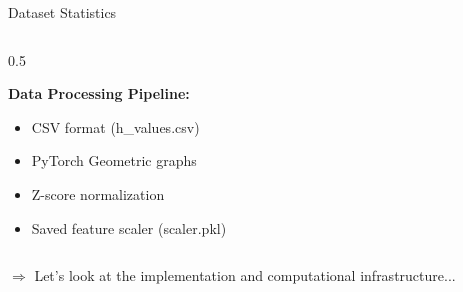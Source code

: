 \documentclass[aspectratio=169]{beamer}
\begin{document}
\begin{frame}{Dataset Statistics}
\begin{columns}
\begin{column}{0.5\textwidth}
            \vspace{0.2cm}
            
            \textbf{Data Processing Pipeline:}
            \begin{itemize}
                \item CSV format (h\_values.csv)
                \item PyTorch Geometric graphs
                \item Z-score normalization
                \item Saved feature scaler (scaler.pkl)
            \end{itemize}
        \end{column}
    \end{columns}
    
    \vspace{0.2cm}
    \small \textcolor{iiitblue}{$\Rightarrow$ Let's look at the implementation and computational infrastructure...}
\end{frame}
\end{document}
